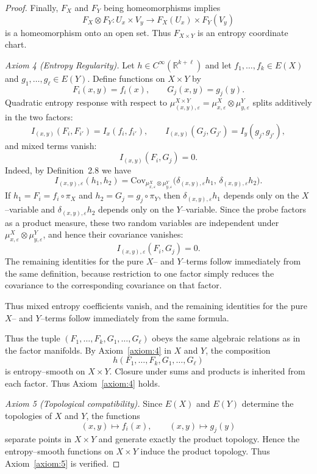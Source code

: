 \documentclass[10pt,a4paper]{amsart}
\begin{document}
\begin{proof}
Finally, $F_X$ and $F_Y$ being homeomorphisms implies
\[
F_X\otimes F_Y : U_x\times V_y \longrightarrow F_X(U_x)\times F_Y(V_y)
\]
is a homeomorphism onto an open set. Thus $F_{X\times Y}$ is an entropy coordinate chart.

\medskip

\emph{Axiom 4 (Entropy Regularity).}
Let $h\in C^\infty(\mathbb{R}^{k+\ell})$ and
let $f_1,\dots,f_k\in E(X)$ and $g_1,\dots,g_\ell\in E(Y)$.
Define functions on $X\times Y$ by
\[
F_i(x,y)=f_i(x), \qquad G_j(x,y)=g_j(y).
\]
Quadratic entropy response with respect to
$\mu^{X\times Y}_{(x,y),\varepsilon}
=\mu^X_{x,\varepsilon}\otimes\mu^{Y}_{y,\varepsilon}$
splits additively in the two factors:
\[
I_{(x,y)}(F_i,F_{i'})
= I_x(f_i,f_{i'}),\qquad
I_{(x,y)}(G_j,G_{j'})
= I_y(g_j,g_{j'}),
\]
and mixed terms vanish:
\[
I_{(x,y)}(F_i,G_j)=0.
\]
Indeed, by Definition~2.8 we have
\[
I_{(x,y),\varepsilon}(h_1,h_2)=\mathrm{Cov}_{\mu^X_{x,\varepsilon}\otimes\mu^Y_{y,\varepsilon}}
\bigl(\delta_{(x,y),\varepsilon} h_1,\,\delta_{(x,y),\varepsilon} h_2\bigr).
\]
If $h_1=F_i=f_i\circ\pi_X$ and $h_2=G_j=g_j\circ\pi_Y$, then
$\delta_{(x,y),\varepsilon}h_1$ depends only on the $X$--variable and
$\delta_{(x,y),\varepsilon}h_2$ depends only on the $Y$--variable. Since the probe factors as a product measure, these two random variables are independent under
$\mu^X_{x,\varepsilon}\otimes\mu^Y_{y,\varepsilon}$, and hence their covariance vanishes:
\[
I_{(x,y),\varepsilon}(F_i,G_j)=0.
\]
The remaining identities for the pure $X$-- and $Y$--terms follow immediately from the same definition, because restriction to one factor simply reduces the covariance to the corresponding covariance on that factor.

Thus mixed entropy coefficients vanish, and the remaining identities for the pure $X$-- and $Y$--terms follow immediately from the same formula.

Thus the tuple $(F_1,\dots,F_k,G_1,\dots,G_\ell)$
obeys the same algebraic relations as in the factor manifolds.
By Axiom~\ref{axiom:4} in $X$ and $Y$, the composition
\[
h(F_1,\dots,F_k,G_1,\dots,G_\ell)
\]
is entropy–smooth on $X\times Y$. Closure under sums and products is inherited from each factor.
Thus Axiom~\ref{axiom:4} holds.

\medskip

\emph{Axiom 5 (Topological compatibility).}
Since $E(X)$ and $E(Y)$ determine the topologies of $X$ and $Y$,
the functions
\[
(x,y)\mapsto f_i(x),\qquad (x,y)\mapsto g_j(y)
\]
separate points in $X\times Y$ and generate exactly the product topology.
Hence the entropy–smooth functions on $X\times Y$ induce the product topology.
Thus Axiom~\ref{axiom:5} is verified.


\end{proof}
\end{document}
